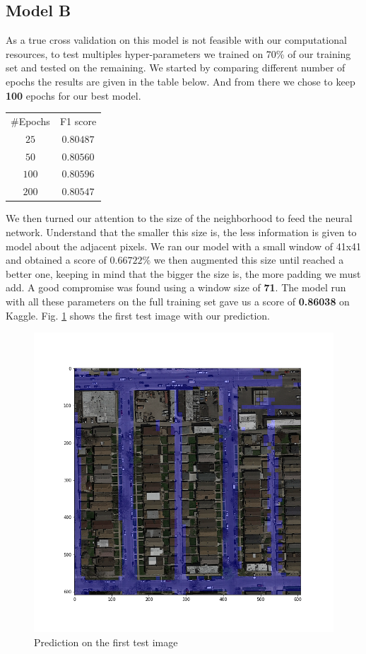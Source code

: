 \documentclass[10pt,conference,compsocconf]{IEEEtran}
\begin{document}
\subsection{Model B}
As a true cross validation on this model is not feasible with our computational resources, to test multiples hyper-parameters we trained on 70\% of our training set and tested on the remaining. We started by comparing different number of epochs the results are given in the table below. And from there we chose to keep \textbf{100} epochs for our best model.
\begin{center}
\begin{tabular}{c | c}
\#Epochs & F1 score\\ \hhline{==}
$25$ & $0.80487$\\
$50$ & $0.80560$\\
$100$ & $0.80596$\\
$200$ & $0.80547$
\end{tabular}
\end{center}

We then turned our attention to the size of the neighborhood to feed the neural network. Understand that the smaller this size is, the less information is given to model about the adjacent pixels. We ran our model with a small window of 41x41 and obtained a score of $0.66722\%$ we then augmented this size until reached a better one, keeping in mind that the bigger the size is, the more padding we must add. A good compromise was found using a window size of \textbf{71}. The model run with all these parameters on the full training set gave us a score of \textbf{0.86038} on Kaggle.
Fig. \ref{overlay} shows the first test image with our prediction.

\begin{figure}[h]
  \centering
  \includegraphics[width=\columnwidth]{overlay_rapport.png}
  \caption{Prediction on the first test image}
  \vspace{-3mm}
  \label{overlay}
\end{figure}
\end{document}
